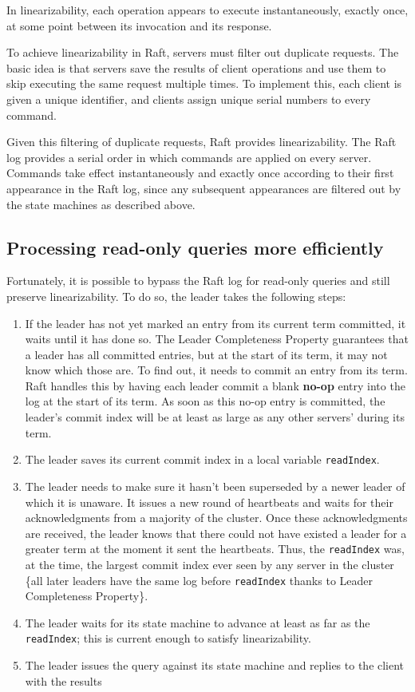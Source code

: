 \documentclass[11pt]{article}
\begin{document}
In linearizability, each operation appears to execute instantaneously, exactly once, at some point
between its invocation and its response.

To achieve linearizability in Raft, servers must filter out duplicate requests. The basic idea is that
servers save the results of client operations and use them to skip executing the same request multiple
times. To implement this, each client is given a unique identifier, and clients assign unique serial
numbers to every command.

Given this filtering of duplicate requests, Raft provides linearizability. The Raft log provides a
serial order in which commands are applied on every server. Commands take effect instantaneously and
exactly once according to their first appearance in the Raft log, since any subsequent appearances are
filtered out by the state machines as described above.
\subsection{Processing read-only queries more efficiently}
\label{sec:orga12116c}
Fortunately, it is possible to bypass the Raft log for read-only queries and still preserve
linearizability. To do so, the leader takes the following steps:
\begin{enumerate}
\item If the leader has not yet marked an entry from its current term committed, it waits until it has
done so. The Leader Completeness Property guarantees that a leader has all committed entries, but
at the start of its term, it may not know which those are. To find out, it needs to commit an entry
from its term. Raft handles this by having each leader commit a blank \textbf{no-op} entry into the log at
the start of its term. As soon as this no-op entry is committed, the leader's commit index will be at least as large as any other servers' during its term.
\item The leader saves its current commit index in a local variable \texttt{readIndex}.
\item The leader needs to make sure it hasn’t been superseded by a newer leader of which it is unaware.
It issues a new round of heartbeats and waits for their acknowledgments from a majority of the
cluster. Once these acknowledgments are received, the leader knows that there could not have
existed a leader for a greater term at the moment it sent the heartbeats. Thus, the \texttt{readIndex} was,
at the time, the largest commit index ever seen by any server in the cluster \wu\{all later leaders
have the same log before \texttt{readIndex} thanks to Leader Completeness Property\}.
\item The leader waits for its state machine to advance at least as far as the \texttt{readIndex}; this is current enough to satisfy linearizability.
\item The leader issues the query against its state machine and replies to the client with the results
\end{enumerate}
\end{document}
